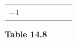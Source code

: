 {\begin{center}
\begin{xtabular*}{\mytablewidth}[t]{|p{10\mystarwidth}|p{10\mystarwidth}|p{10\mystarwidth}|p{10\mystarwidth}|p{10\mystarwidth}|p{10\mystarwidth}|p{10\mystarwidth}|}
                  \begin{math}-1\end{math}
     \tabularnewline{}
    \end{xtabular*}
      \end{center}
    \begin{center}{\small\bfseries Table 14.8}\end{center}
    
    \addtocounter{footnote}{-0}
    
        }%
      
    \par
  
